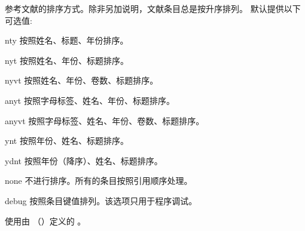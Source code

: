 \begin{optionlist}


参考文献的排序方式。除非另加说明，文献条目总是按升序排列。
默认提供以下可选值:

\begin{valuelist}
\item[nty] %
按照姓名、标题、年份排序。
\item[nyt] %
按照姓名、年份、标题排序。
\item[nyvt] %
按照姓名、年份、卷数、标题排序。
\item[anyt] %
按照字母标签、姓名、年份、标题排序。
\item[anyvt] %
按照字母标签、姓名、年份、卷数、标题排序。
\item[ynt] %
按照年份、姓名、标题排序。
\item[ydnt] %
按照年份（降序）、姓名、标题排序。
\item[none] %
不进行排序。所有的条目按照引用顺序处理。
\item[debug] %
按照条目键值排列。该选项只用于程序调试。
\item[\prm{name}] %
使用由 （）定义的 。
\end{valuelist}



\end{optionlist}
